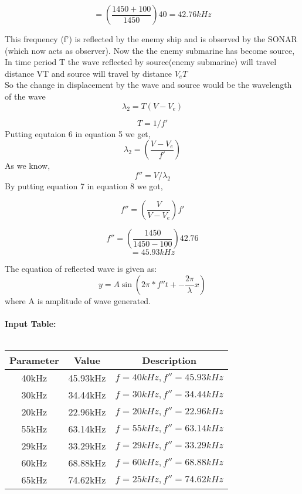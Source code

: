 \documentclass[journal,12pt,twocolumn]{IEEEtran}
\theoremstyle{remark}
\begin{document}
$$= (\frac{1450+100}{1450})40=42.76kHz$$

This frequency (f') is reflected by the enemy ship and is observed by the SONAR (which now acts as observer).
Now the the enemy submarine has become source,\\
In time period T the wave reflected by source(enemy submarine) will travel distance VT and source will travel by distance $V_eT$\\
So the change in displacement by the wave and source would be the wavelength of the wave
\begin{equation}
\lambda_2=T(V-V_e)
\end{equation}

\begin{equation}
T=1/f'
\end{equation}
Putting equtaion 6 in equation 5 we get,
\begin{equation}
\lambda_2=(\frac{V-V_e}{f'})
\end{equation}
As we know,
\begin{equation}
f''=V/\lambda_2
\end{equation}
By putting equation 7 in equation 8 we got,

\begin{equation}
f''=(\frac{V}{V-V_e})f'
\end{equation}

$$f''=(\frac{1450}{1450-100})42.76$$
$$=45.93kHz$$

The equation of reflected wave is given as:
\begin{equation}
y=A\sin(2\pi*f''t+-\frac{2\pi}{\lambda}x)
\end{equation}
where A is amplitude of wave generated.
\\
\\

\textbf{Input Table:}\\
\\
\begin{tabular}{|c|c|c|}
   \hline
   Parameter & Value & Description\\
   \hline
   40kHz & 45.93kHz & $f=40kHz, f''=45.93kHz$\\
   \hline
   30kHz & 34.44kHz & $f=30kHz, f''=34.44kHz$\\
   \hline
   20kHz & 22.96kHz & $f=20kHz, f''=22.96kHz$\\
   \hline
   55kHz & 63.14kHz& $f=55kHz, f''=63.14kHz$\\
   \hline
   29kHz & 33.29kHz& $f=29kHz, f''=33.29kHz$\\
   \hline
   60kHz & 68.88kHz& $f=60kHz, f''=68.88kHz$\\
   \hline
   65kHz & 74.62kHz& $f=25kHz, f''=74.62kHz$\\
   \hline
\end{tabular}
\end{document}
